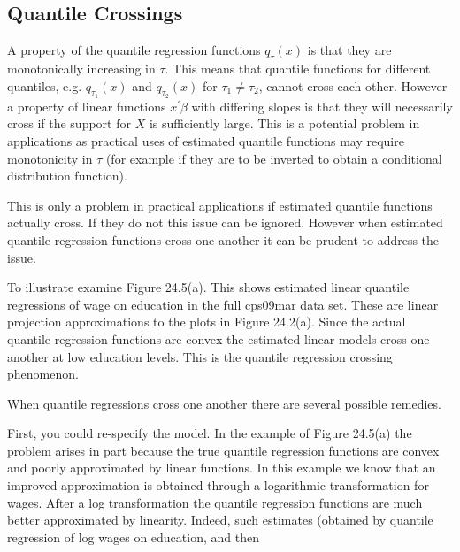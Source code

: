 \documentclass[10pt]{article}
\begin{document}
\subsection{Quantile Crossings}
A property of the quantile regression functions $q_{\tau}(x)$ is that they are monotonically increasing in $\tau$. This means that quantile functions for different quantiles, e.g. $q_{\tau_{1}}(x)$ and $q_{\tau_{2}}(x)$ for $\tau_{1} \neq \tau_{2}$, cannot cross each other. However a property of linear functions $x^{\prime} \beta$ with differing slopes is that they will necessarily cross if the support for $X$ is sufficiently large. This is a potential problem in applications as practical uses of estimated quantile functions may require monotonicity in $\tau$ (for example if they are to be inverted to obtain a conditional distribution function).

This is only a problem in practical applications if estimated quantile functions actually cross. If they do not this issue can be ignored. However when estimated quantile regression functions cross one another it can be prudent to address the issue.

To illustrate examine Figure 24.5(a). This shows estimated linear quantile regressions of wage on education in the full cps09mar data set. These are linear projection approximations to the plots in Figure 24.2(a). Since the actual quantile regression functions are convex the estimated linear models cross one another at low education levels. This is the quantile regression crossing phenomenon.

When quantile regressions cross one another there are several possible remedies.

First, you could re-specify the model. In the example of Figure 24.5(a) the problem arises in part because the true quantile regression functions are convex and poorly approximated by linear functions. In this example we know that an improved approximation is obtained through a logarithmic transformation for wages. After a log transformation the quantile regression functions are much better approximated by linearity. Indeed, such estimates (obtained by quantile regression of log wages on education, and then
\end{document}
